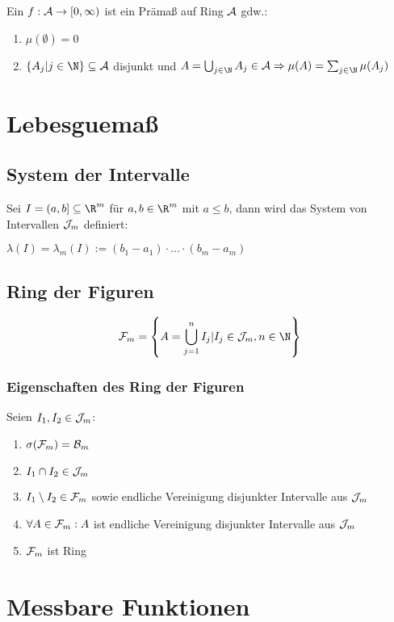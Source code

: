 Ein $f : \mathcal{A} \to [0, \infty)$ ist ein Prämaß auf Ring $\mathcal{A}$ gdw.:

\begin{enumerate}[label=(\alph*)]
	\item $\mu(\emptyset) = 0$
	\item $\{A_j | j \in \N\} \subseteq \A$ disjunkt und $A = \bigcup_{j\in \N} A_j \in \A \Rightarrow \mu(A) = \sum_{j\in \N} \mu(A_j)$
\end{enumerate}

\section*{Lebesguemaß}

\subsection*{System der Intervalle}

Sei $I = (a, b] \subseteq \R^m$ für $a, b \in \R^m$ mit $a \leq b$, dann wird das System von Intervallen $\mathcal{J}_m$ definiert:

$\lambda(I) = \lambda_m(I) := (b_1 - a_1) \cdot \hdots \cdot (b_m - a_m)$

\subsection*{Ring der Figuren}

$$\F_m = \left\{ A = \bigcup_{j=1}^n I_j | I_j \in \J_m, n \in \N \right\}$$

\subsubsection*{Eigenschaften des Ring der Figuren}

Seien $I_1, I_2 \in \mathcal{J}_m$:

\begin{enumerate}[label=(\alph*)]
	\item $\sigma(\mathcal{F}_m) = \mathcal{B}_m$
	\item $I_1 \cap I_2 \in \mathcal{J}_m$
	\item $I_1 \setminus I_2 \in \mathcal{F}_m$ sowie endliche Vereinigung disjunkter Intervalle aus $\mathcal{J}_m$
	\item $\forall A \in \mathcal{F}_m: A$ ist endliche Vereinigung disjunkter Intervalle aus $\mathcal{J}_m$
	\item $\mathcal{F}_m$ ist Ring
\end{enumerate}

\section*{Messbare Funktionen}

